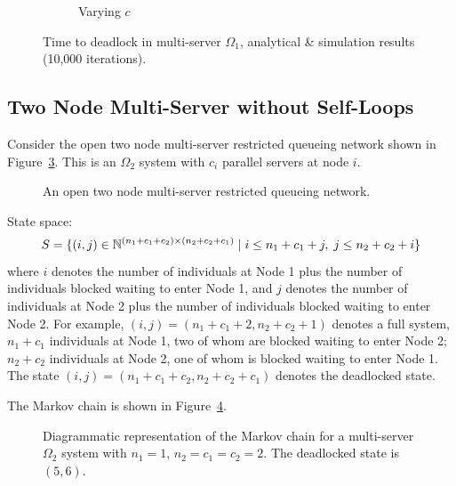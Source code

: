 \documentclass{article}
\numberwithin{equation}{section}
\begin{document}
\begin{figure}[!htbp]
\begin{center}
\begin{subfigure}[b]{0.35\textwidth}
    \caption{Varying $c$}
    \label{fig:1Nms_c}
  \end{subfigure}
  \end{center}
  \caption{Time to deadlock in multi-server $\Omega_1$, analytical \& simulation results (10,000 iterations).}
  \label{fig:timestodeadlock1nodemultiserver}
\end{figure}


\subsection{Two Node Multi-Server without Self-Loops}\label{sec:2nodeMS}

Consider the open two node multi-server restricted queueing network shown in Figure~\ref{fig:queueingnetwork_2nodemulti}.
This is an $\Omega_2$ system with $c_i$ parallel servers at node $i$.

\begin{figure}[!htbp]
  \begin{center}
  
  \end{center}
  \caption{An open two node multi-server restricted queueing network.}
  \label{fig:queueingnetwork_2nodemulti}
\end{figure}

State space:
        \[S = \{(i,j)\in\mathbb{N}^{(n_1+c_1+c_2)\times (n_2+c_2+c_1)} \nonscript\; | \nonscript\; i \leq n_1+c_1+j, \nonscript\; j \leq n_2+c_2+i\}\]
where $i$ denotes the number of individuals at Node 1 plus the number of individuals blocked waiting to enter Node 1, and $j$ denotes the number of individuals at Node 2 plus the number of individuals blocked waiting to enter Node 2.
For example, $(i, j) = (n_1+c_1+2, n_2+c_2+1)$ denotes a full system, $n_1+c_1$ individuals at Node 1, two of whom are blocked waiting to enter Node 2; $n_2+c_2$ individuals at Node 2, one of whom is blocked waiting to enter Node 1.
The state $(i, j) = (n_1+c_1+c_2, n_2+c_2+c_1)$ denotes the deadlocked state.

The Markov chain is shown in Figure~\ref{fig:2nodeMCms}.

\begin{figure}[!htbp]
    
    \caption{Diagrammatic representation of the Markov chain for a multi-server $\Omega_2$ system with $n_1=1$, $n_2=c_1=c_2=2$. The deadlocked state is $(5,6)$.}
    \label{fig:2nodeMCms}
\end{figure}
\end{document}
